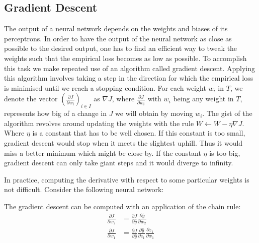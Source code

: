 \documentclass{article}
\theoremstyle{plain}
\theoremstyle{definition}
\theoremstyle{remark}
\begin{document}
\subsection{Gradient Descent}
	The output of a neural network depends on the weights and biases of its perceptrons. In order to have the output of the neural network as close as possible to the desired output, one has to find an efficient way to tweak the weights such that the empirical loss becomes as low as possible. To accomplish this task we make repeated use of an algorithm called gradient descent.
	Applying this algorithm involves taking a step in the direction for which the empirical loss is minimised until we reach a stopping condition.  For each weight $w_i$ in $T$, we denote the vector $ \left(\frac{\partial J}{\partial w_i} \right)_{i\in I} $ as $\nabla J$, where $ \frac{\partial J}{\partial w_i} $ with $w_i$ being any weight in $T$, represents how big of a change in $J$ we will obtain by moving $w_i$. The gist of the algorithm revolves around updating the weights with the rule $W \gets W - \eta \nabla J$. Where $\eta$ is a constant that has to be well chosen. If this constant is too small, gradient descent would stop when it meets the slightest uphill. Thus it would miss a better minimum which might be close by. If the constant $\eta$ is too big, gradient descent can only take giant steps and it would diverge to infinity.


	In practice, computing the derivative with respect to some particular weights is not difficult. Consider the following neural network: \\
		\begin{minipage}{0.55\linewidth}
		\end{minipage}
	\begin{minipage}{0.4\linewidth}
	    The gradient descent can be computed with an application of the chain rule:
		\begin{align*}
		\frac{\partial J}{\partial w_2} &=\frac{\partial J}{\partial \hat{y}} \frac{\partial \hat{y}}{\partial w_2} \\
		\frac{\partial J}{\partial w_1} &= \frac{\partial J}{\partial \hat{y}}\frac{\partial \hat{y}}{\partial z_1}\frac{\partial z_1}{\partial w_1}
		\end{align*}
	\end{minipage}
\end{document}
